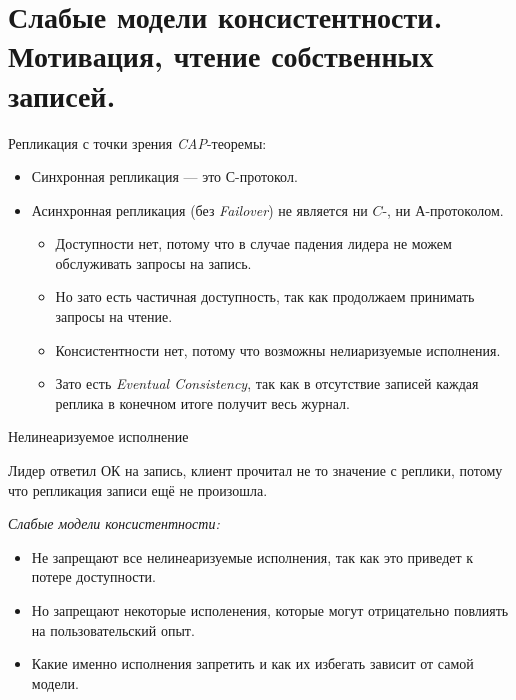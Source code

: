 \section{Слабые модели консистентности. Мотивация, чтение собственных записей.}

\begin{remark}
    Репликация с точки зрения \textit{CAP}-теоремы:
    \begin{itemize}
        \item Синхронная репликация --- это $С$-протокол.
        \item Асинхронная репликация (без \textit{Failover}) не является ни $C$-, ни $А$-протоколом.
        \begin{itemize}
            \item Доступности нет, потому что в случае падения лидера не можем обслуживать запросы на запись.
            \item Но зато есть частичная доступность, так как продолжаем принимать запросы на чтение.
            \item Консистентности нет, потому что возможны нелиаризуемые исполнения.
            \item Зато есть \textit{Eventual Consistency}, так как в отсутствие записей каждая реплика в конечном итоге получит весь журнал.
        \end{itemize}
    \end{itemize}
\end{remark}

\begin{example}{Нелинеаризуемое исполнение}

    Лидер ответил ОК на запись, клиент прочитал не то значение с реплики, потому что репликация записи ещё не произошла.
\end{example}

\begin{definition}
    \textit{Слабые модели консистентности:}
    \begin{itemize}
        \item Не запрещают все нелинеаризуемые исполнения, так как это приведет к потере доступности.
        \item Но запрещают некоторые исполенения, которые могут отрицательно повлиять на пользовательский опыт.
        \item Какие именно исполнения запретить и как их избегать зависит от самой модели.
    \end{itemize}

\end{definition}

